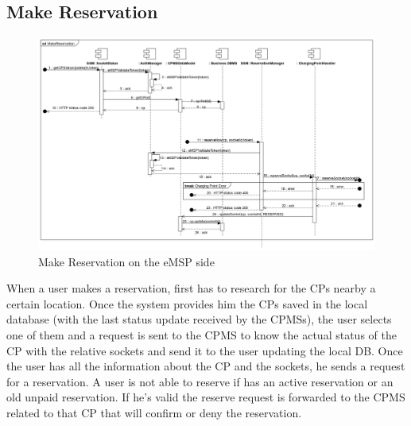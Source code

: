\documentclass{Configuration_Files/PoliMi3i_thesis}
\begin{document}
\subsection{Make Reservation}
\begin{figure}[H]
    \centering
    \includegraphics[width=1\textwidth]{Images/sequenceDiagrams/MakeReservation.jpg}
    \caption{Make Reservation on the eMSP side}
\end{figure}
When a user makes a reservation, first has to research for the CPs nearby a certain location. Once the system provides him the CPs saved in the local database (with the last status update received by the CPMSs), the user selects one of them and a request is sent to the CPMS to know the actual status of the CP with the relative sockets and send it to the user updating the local DB.
Once the user has all the information about the CP and the sockets, he sends a request for a reservation. A user is not able to reserve if has an active reservation or an old unpaid reservation. If he's valid the reserve request is forwarded to the CPMS related to that CP that will confirm or deny the reservation.
\end{document}
